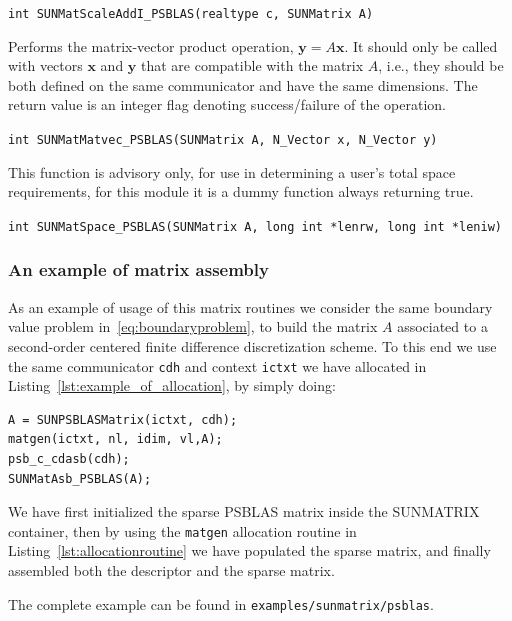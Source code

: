 \documentclass[twoside,a4paper]{refart}
\theoremstyle{definition}
\begin{document}
\begin{description}
 \lstinline[style=CStyle]|int SUNMatScaleAddI_PSBLAS(realtype c, SUNMatrix A)|

\item[\fbox{\texttt{SUNMatMatvec\_PSBLAS}}] Performs the matrix-vector product operation, $\mathbf{y} = A\mathbf{x}$. It should only be
called with vectors $\mathbf{x}$ and $\mathbf{y}$ that are compatible with the matrix $A$, i.e., they should be both defined on the same communicator and have the same dimensions. The return value is an integer flag denoting
success/failure of the operation.

 \lstinline[style=CStyle]|int SUNMatMatvec_PSBLAS(SUNMatrix A, N_Vector x, N_Vector y)|

\item[\fbox{\texttt{SUNMatSpace\_PSBLAS}}] This function is advisory only, for use in determining a user's total space requirements, for this module it is a dummy function always returning true.

 \lstinline[style=CStyle]|int SUNMatSpace_PSBLAS(SUNMatrix A, long int *lenrw, long int *leniw)|
\end{description}

\subsubsection{An example of matrix assembly}\label{sec:example_of_matrix_assembly}

As an example of usage of this matrix routines we consider the same boundary value problem in~\eqref{eq:boundaryproblem}, to build the matrix $A$ associated to a second-order centered finite difference discretization scheme.
To this end we use the same communicator \texttt{cdh} and context \texttt{ictxt} we have allocated in Listing~\ref{lst:example_of_allocation}, by simply doing:
\begin{lstlisting}[style=CStyle]
A = SUNPSBLASMatrix(ictxt, cdh);
matgen(ictxt, nl, idim, vl,A);
psb_c_cdasb(cdh);
SUNMatAsb_PSBLAS(A);
\end{lstlisting}
We have first initialized the sparse PSBLAS matrix inside the SUNMATRIX container, then by using the \texttt{matgen} allocation routine in Listing~\ref{lst:allocationroutine} we have populated the sparse matrix, and finally assembled both the descriptor and the sparse matrix.

The complete example can be found in \texttt{examples/sunmatrix/psblas}.
\end{document}
